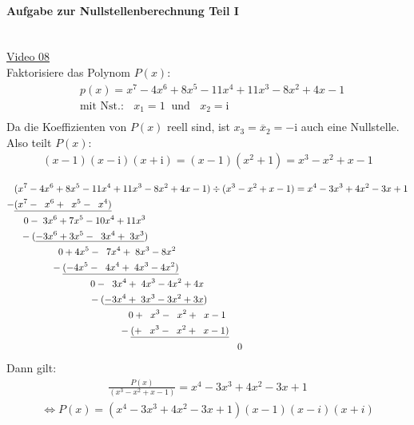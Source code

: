 \paragraph{Aufgabe zur Nullstellenberechnung Teil I}$  $\vspace*{3mm}\\
\href{https://youtu.be/ujBUQtLfSI4}{Video 08}\\
Faktorisiere das Polynom $ P(x) $:\\
\begin{align*}
&p(x)=x^7-4x^6+8x^5-11x^4+11x^3-8x^2+4x-1\\
&\text{mit Nst.: }\;\;x_1=1\;\;\text{und }\;\;x_2=\mathrm{i}\\
\end{align*}
Da die Koeffizienten von $ P(x) $ reell sind, ist $ x_3=\overline{x}_2=-\mathrm{i} $ auch eine Nullstelle.\\
Also teilt $ P(x) $:\\
\begin{align*}
(x-1)(x-\mathrm{i})(x+\mathrm{i})=(x-1)(x^2+1)=x^3-x^2+x-1\\
\end{align*}
\begin{align*}
&(x^7-4x^6+8x^5-11x^4+11x^3-8x^2+4x-1)\div(x^3-x^2+x-1)=x^4-3x^3+4x^2-3x+1\\
-&\underline{(x^7-\;\;x^6+\;\;x^5-\;\;x^4)}\\
&\hspace{0.35cm}0-\;3x^6+7x^5-10x^4+11x^3\\
&\hspace{0.22cm}-(\underline{-3x^6+3x^5-\;\;3x^4+\;3x^3})\\
&\hspace{1.62cm} 0+4x^5-\;\;7x^4+\;8x^3-8x^2\\
&\hspace{1.35cm}-\underline{(-4x^5-\;\;4x^4+\;4x^3-4x^2)}\\
&\hspace{2.8cm} 0-\;\;3x^4+\;4x^3-4x^2+4x\\
&\hspace{2.75cm}-(\underline{-3x^4+\;3x^3-3x^2+3x})\\
&\hspace{4.2cm} 0+\;\;x^3-\;\;x^2+\;\;x-1\\
&\hspace{3.85cm}-\underline{(+\;\;\;x^3-\;\;x^2+\;\;x-1)}\\
&\hspace{8.2cm}0
\end{align*}
Dann gilt:\\
\begin{align*}
\frac{P(x)}{(x^3-x^2+x-1)}=x^4-3x^3+4x^2-3x+1
\end{align*}
\begin{align*}
\Leftrightarrow P(x)=(x^4-3x^3+4x^2-3x+1)(x-1)(x-i)(x+i)\\
\end{align*}
